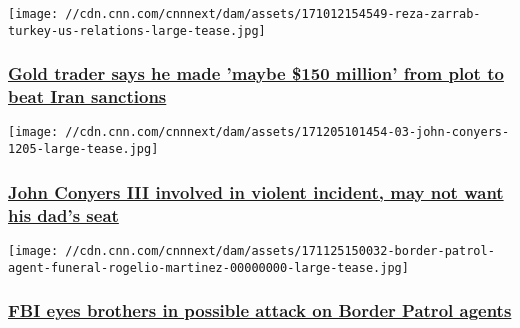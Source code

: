\texttt{[image: //cdn.cnn.com/cnnnext/dam/assets/171012154549-reza-zarrab-turkey-us-relations-large-tease.jpg]}

\hypertarget{gold-trader-says-he-made-maybe-150-million-from-plot-to-beat-iran-sanctions}{%
\subsubsection{\texorpdfstring{\href{/2017/12/07/us/zarrab-iran-sanctions-trial/index.html}{Gold
trader says he made 'maybe \$150 million' from plot to beat Iran
sanctions}}{Gold trader says he made 'maybe \$150 million' from plot to beat Iran sanctions}}\label{gold-trader-says-he-made-maybe-150-million-from-plot-to-beat-iran-sanctions}}

\href{/2017/12/06/politics/john-conyers-iii-john-conyers/index.html}{}

\texttt{[image: //cdn.cnn.com/cnnnext/dam/assets/171205101454-03-john-conyers-1205-large-tease.jpg]}

\hypertarget{john-conyers-iii-involved-in-violent-incident-may-not-want-his-dads-seat-}{%
\subsubsection{\texorpdfstring{\href{/2017/12/06/politics/john-conyers-iii-john-conyers/index.html}{John
Conyers III involved in violent incident, may not want his dad's seat
}}{John Conyers III involved in violent incident, may not want his dad's seat }}\label{john-conyers-iii-involved-in-violent-incident-may-not-want-his-dads-seat-}}

\href{/2017/12/06/us/border-patrol-agent-death-fbi-theory/index.html}{}

\texttt{[image: //cdn.cnn.com/cnnnext/dam/assets/171125150032-border-patrol-agent-funeral-rogelio-martinez-00000000-large-tease.jpg]}

\hypertarget{fbi-eyes-brothers-in-possible-attack-on-border-patrol-agents}{%
\subsubsection{\texorpdfstring{\href{/2017/12/06/us/border-patrol-agent-death-fbi-theory/index.html}{FBI
eyes brothers in possible attack on Border Patrol
agents}}{FBI eyes brothers in possible attack on Border Patrol agents}}\label{fbi-eyes-brothers-in-possible-attack-on-border-patrol-agents}}

\href{/2017/12/06/politics/puerto-rico-blue-roof-contract-invs/index.html}{}

